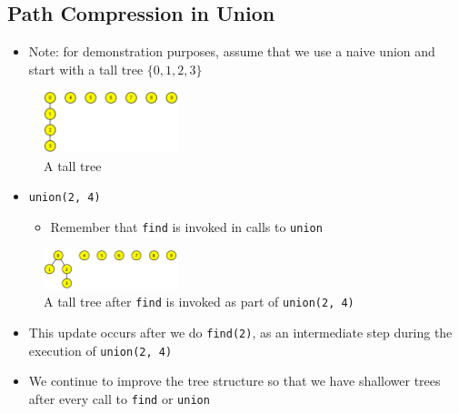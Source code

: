 \documentclass[
  10pt,
  english,
  letterpaper,
,tablecaptionabove
]{scrartcl}
\newcommand{\passthrough}[1]{#1}
\providecommand{\tightlist}{%
  \setlength{\itemsep}{0pt}\setlength{\parskip}{0pt}}
\begin{document}
\hypertarget{path-compression-in-union}{%
\subsection{Path Compression in Union}\label{path-compression-in-union}}

\begin{itemize}
\tightlist
\item
  Note: for demonstration purposes, assume that we use a naive union and
  start with a tall tree \(\{0,1,2,3\}\)
\end{itemize}

\begin{figure}
\centering
\includegraphics[width=0.35\textwidth,height=\textheight]{images/3.png}
\caption{A tall tree}
\end{figure}

\begin{itemize}
\tightlist
\item
  \passthrough{\lstinline!union(2, 4)!}

  \begin{itemize}
  \tightlist
  \item
    Remember that \passthrough{\lstinline!find!} is invoked in calls to
    \passthrough{\lstinline!union!}
  \end{itemize}
\end{itemize}

\begin{figure}
\centering
\includegraphics[width=0.35\textwidth,height=\textheight]{images/4.png}
\caption{A tall tree after \passthrough{\lstinline!find!} is invoked as
part of \passthrough{\lstinline!union(2, 4)!}}
\end{figure}

\begin{itemize}
\tightlist
\item
  This update occurs after we do \passthrough{\lstinline!find(2)!}, as
  an intermediate step during the execution of
  \passthrough{\lstinline!union(2, 4)!}
\item
  We continue to improve the tree structure so that we have shallower
  trees after every call to \passthrough{\lstinline!find!} or
  \passthrough{\lstinline!union!}
\end{itemize}
\end{document}
